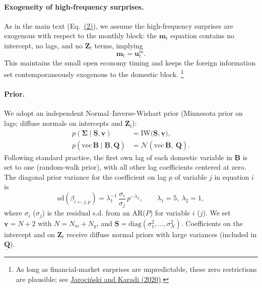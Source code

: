 \documentclass[12pt, reqno]{article}
\begin{document}
\paragraph{Exogeneity of high-frequency surprises.}
As in the main text (Eq.~\hyperlink{(2)}{(2)}), we assume the high-frequency surprises are exogenous with respect to the monthly block: the $\boldsymbol{m}_t$ equation contains no intercept, no lags, and no $\boldsymbol{Z}_t$ terms, implying
\[
\boldsymbol{m}_t=\boldsymbol{u}^m_t.
\]
This maintains the small open economy timing and keeps the foreign information set contemporaneously exogenous to the domestic block.%
\footnote{As long as financial-market surprises are unpredictable, these zero restrictions are plausible; see \hyperlink{JK (2020)}{Jarociński and Karadi (2020)}.}

\paragraph{Prior.}
We adopt an independent Normal–Inverse-Wishart prior (Minnesota prior on lags; diffuse normals on intercepts and $\boldsymbol{Z}_t$):
\begin{align}
p(\boldsymbol{\Sigma}\mid \underline{\boldsymbol{S}},\underline{\boldsymbol{v}})
&= \mathrm{IW}\!\big(\underline{\boldsymbol{S}},\underline{\boldsymbol{v}}\big),\\
p\!\left(\mathrm{vec}\,\boldsymbol{B}\mid \underline{\boldsymbol{B}},\underline{\boldsymbol{Q}}\right)
&= \mathcal{N}\!\left(\mathrm{vec}\,\underline{\boldsymbol{B}},\ \underline{\boldsymbol{Q}}\right).
\end{align}
Following standard practice, the first own lag of each domestic variable in $\underline{\boldsymbol{B}}$ is set to one (random-walk prior), with all other lag coefficients centered at zero. The diagonal prior variance for the coefficient on lag $p$ of variable $j$ in equation $i$ is
\[
\mathrm{sd}\!\left(\beta_{i\leftarrow j,p}\right)=\lambda_1^{-1}\,\frac{\sigma_i}{\sigma_j}\,p^{-\lambda_2},\qquad \lambda_1=5,\ \lambda_2=1,
\]
where $\sigma_i$ ($\sigma_j$) is the residual s.d. from an AR($P$) for variable $i$ ($j$). We set $\underline{\boldsymbol{v}}=N+2$ with $N=N_m+N_y$, and $\underline{\boldsymbol{S}}=\mathrm{diag}(\sigma_1^2,\ldots,\sigma_N^2)$. Coefficients on the intercept and on $\boldsymbol{Z}_t$ receive diffuse normal priors with large variances (included in $\underline{\boldsymbol{Q}}$).
\end{document}
